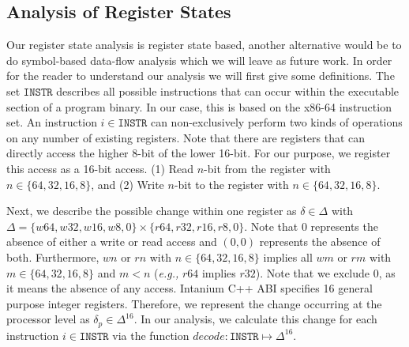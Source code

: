 \subsection{Analysis of Register States}
\label{section:instructionanalysis}

Our register state analysis is register state based, another alternative would be to do symbol-based data-flow analysis which we will leave as future work.
In order for the reader to understand our analysis we will first give some definitions.
The set $\texttt{INSTR}$ describes all possible instructions that can occur within the executable section of a program binary. In our case,
this is based on the x86-64 instruction set. An instruction $i \in \texttt{INSTR}$ can non-exclusively perform two kinds of operations on any number of existing 
registers. Note that there are registers that can directly access the higher 
8-bit of the lower 16-bit. For our purpose, we register this access as a 16-bit access.
(1) Read $n$-bit from the register with $n \in \{ 64, 32, 16, 8 \}$, and 
(2) Write $n$-bit to the register with $n \in \{ 64, 32, 16, 8 \}$.

Next, we describe the possible change within one register as $\delta \in \Delta$ with $\Delta = \{ w64, w32, w16, w8, 0 \} \times \{r64, r32, r16, r8, 0 \}$. 
Note that 0 represents 
the absence of either a write or read access and $(0, 0)$ represents the absence of both. Furthermore, $wn$ or $rn$ with $n \in \{64,32,16,8\}$ implies all $wm$ or $rm$ with $m \in 
\{64,32,16,8\}$ and $m < n$ (\textit{e.g.,} $r64$ implies $r32$). Note that we exclude 0, as it means the absence of any access.
Intanium C++ ABI specifies 16 general purpose integer registers. Therefore, we represent the change occurring at the processor level as $\delta_p \in \Delta^{16}$. 
In our analysis, we calculate this change for each instruction $i \in \texttt{INSTR}$ via the function $decode : \texttt{INSTR} \mapsto \Delta^{16}$.


